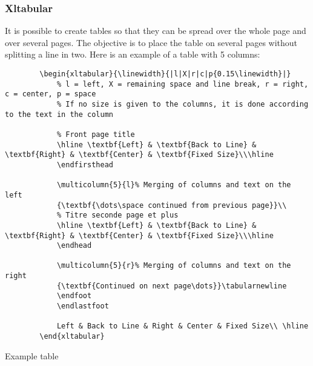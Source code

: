 \subsubsection{Xltabular}
It is possible to create tables so that they can be spread over the whole page and over several pages.
The objective is to place the table on several pages without splitting a line in two.
Here is an example of a table with 5 columns:
\begin{code}
    \begin{verbatim}
        \begin{xltabular}{\linewidth}{|l|X|r|c|p{0.15\linewidth}|}
            % l = left, X = remaining space and line break, r = right, c = center, p = space
            % If no size is given to the columns, it is done according to the text in the column

            % Front page title
            \hline \textbf{Left} & \textbf{Back to Line} & \textbf{Right} & \textbf{Center} & \textbf{Fixed Size}\\\hline
            \endfirsthead

            \multicolumn{5}{l}% Merging of columns and text on the left
            {\textbf{\dots\space continued from previous page}}\\
            % Titre seconde page et plus
            \hline \textbf{Left} & \textbf{Back to Line} & \textbf{Right} & \textbf{Center} & \textbf{Fixed Size}\\\hline
            \endhead

            \multicolumn{5}{r}% Merging of columns and text on the right
            {\textbf{Continued on next page\dots}}\tabularnewline
            \endfoot
            \endlastfoot

            Left & Back to Line & Right & Center & Fixed Size\\ \hline
        \end{xltabular}
\end{verbatim}
    \caption{Example table}
\end{code}


